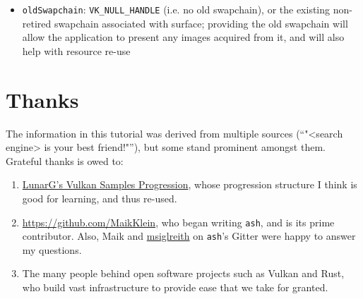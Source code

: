 \documentclass[12pt,letterpaper]{article}
\newcommand{\inquotes}[1]{``#1''}	%
\newcommand{\cil}[1]{\texttt{#1}}
\newcommand{\ash}{\texttt{ash}}
\begin{document}
\begin{itemize}
        \item \cil{oldSwapchain}: \cil{VK_NULL_HANDLE} (i.e. no old swapchain), or the existing non-retired swapchain associated with surface; providing the old swapchain will allow the application to present any images acquired from it, and will also help with resource re-use
    \end{itemize}
    
\section{Thanks}
	The information in this tutorial was derived from multiple sources (\inquotes{"<search engine> is your best friend!"}), but some stand prominent amongst them. Grateful thanks is owed to:
		\begin{enumerate}
			\item \href{https://vulkan.lunarg.com/doc/sdk/1.0.65.1/windows/tutorial/html/index.html}{LunarG's Vulkan Samples Progression}, whose progression structure I think is good for learning, and thus re-used.
			
			\item \href{Maik Klein}{https://github.com/MaikKlein}, who began writing \ash, and is its prime contributor. Also, Maik and \href{https://github.com/msiglreith}{msiglreith} on \ash's Gitter were happy to answer my questions.
			
			\item The many people behind open software projects such as Vulkan and Rust, who build vast infrastructure to provide ease that we take for granted. 
		\end{enumerate}
\printbibliography
\end{document}
